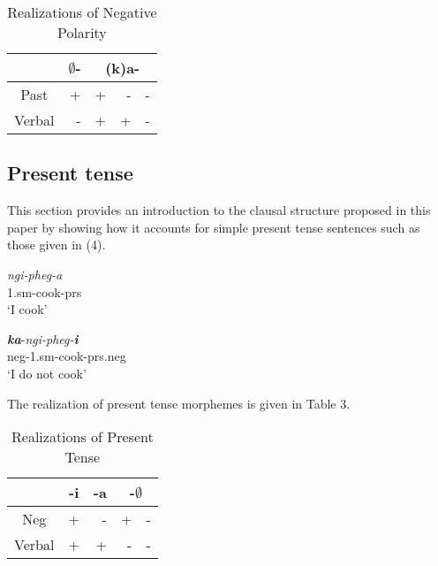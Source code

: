 \documentclass[output=paper]{langsci/langscibook}
\begin{document}
\begin{table}
\caption{Realizations of Negative Polarity} %
\centering %
\begin{tabular}{c| r|rrr} %
\hline %
 &\multicolumn{1}{c}{$\emptyset$-} &\multicolumn{3}{|c}{(k)a-} \\ [0.5ex] 
\hline %
Past & + & + & - & -\\ %
Verbal & - & + & +& -\\[1ex] %
\hline %
\end{tabular} 
\label{tab:hresult} 
\end{table} 






\subsection{Present tense}

This section provides an introduction to the clausal structure proposed in this paper by showing how it accounts for simple present tense sentences such as those given in (4).
 

\begin{exe}
\ex \begin{xlist}
\ex \gll  \textit{ngi-pheg-a}\\
          1.{\sc sm}-cook-\sc prs\\
    \glt `I cook'





\ex \gll  \textit{\textbf{ka}}-\textit{ngi-pheg-\textbf{i}}\\
          {\sc neg}-1.{\sc sm}-cook-{\sc prs.neg}\\
    \glt `I do not cook'
\end{xlist}
\end{exe}
 

The realization of present tense morphemes is given in Table 3.

\begin{table}
\caption{Realizations of Present Tense} %
\centering %
\begin{tabular}{c| r|r|rr} %
\hline %
 &\multicolumn{1}{c}{-i}& \multicolumn{1}{|c|}{-a}& \multicolumn{2}{|c}{-$\emptyset$} \\ [0.5ex] 
\hline %
Neg & + & - & + & -\\ %
Verbal & + & + & -& -\\[1ex] %
\hline %
\end{tabular} 
\label{tab:hresult} 
\end{table} 
\end{document}
